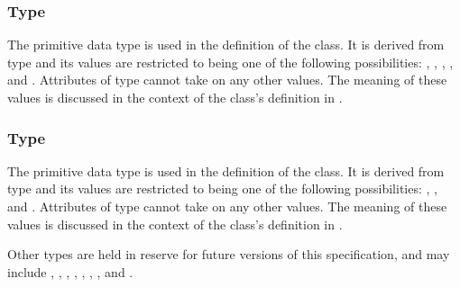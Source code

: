 \subsubsection{Type \fixttspace{}}
\label{primtype-BoundaryConditionKind}

The  primitive data type is used in the definition of the \BoundaryCondition class.  It is derived from type  and its values are restricted to being one of the following possibilities: , , , , and .  Attributes of type  cannot take on any other values.  The meaning of these values is discussed in the context of the \BoundaryCondition class's definition in .


\subsubsection{Type \fixttspace{}}
\label{primtype-CoordinateKind}

The  primitive data type is used in the definition of the \CoordinateComponent class.  It is derived from type  and its values are restricted to being one of the following possibilities: , , and .
Attributes of type  cannot take on any other values.  The meaning of these values is discussed in the context of the \CoordinateComponent class's definition in .

Other  types are held in reserve for future versions of this specification, and may include , , , , , , , and .



%

